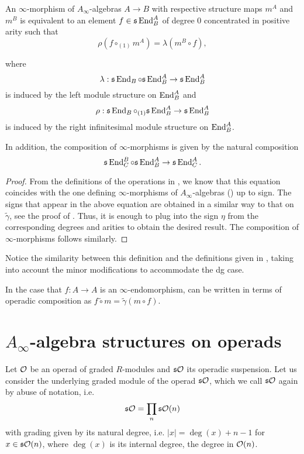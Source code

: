 \documentclass[Thesis.tex]{subfiles}
\begin{document}
\begin{lem}\label{infinitymorphisms}
An $\infty$-morphism of $A_\infty$-algebras $A\to B$ with respective structure maps $m^A$ and $m^B$ is equivalent to an element $f\in\mathfrak{s}\operatorname{End}^A_B$ of degree 0 concentrated in positive arity such that
\begin{equation}\label{operadicmorphism}
\rho(f\circ_{(1)}m^A)=\lambda(m^B\circ f),
\end{equation} 

where \[\lambda:\mathfrak{s}\operatorname{End}_B\circ \mathfrak{s}\operatorname{End}^A_B\to \mathfrak{s}\operatorname{End}^A_B\] is induced by the left module structure on $\operatorname{End}^A_B$ and \[\rho:\mathfrak{s}\operatorname{End}_B\circ_{(1)}\mathfrak{s}\operatorname{End}^A_B\to \mathfrak{s}\operatorname{End}^A_B\] is induced by the right infinitesimal module structure on $\operatorname{End}^A_B$. 

In addition, the composition of $\infty$-morphisms is given by the natural composition \[\mathfrak{s}\operatorname{End}^B_C\circ \mathfrak{s}\operatorname{End}^A_B\to \mathfrak{s}\operatorname{End}^A_C.\]
\end{lem}
\begin{proof}
From the definitions of the operations in , we know that this equation coincides with the one defining $\infty$-morphisms of $A_\infty$-algebras () up to sign. The signs that appear in the above equation are obtained in a similar way to that on $\tilde{\gamma}$, see the proof of . Thus, it is enough to plug into the sign $\eta$ from  the corresponding degrees and arities to obtain the desired result. The composition of $\infty$-morphisms follows similarly.
\end{proof}
Notice the similarity between this definition and the definitions given in \cite[\S 10.2.4]{lodayvallette}, taking into account the minor modifications to accommodate the dg case.

In the case that $f:A\to A$ is an $\infty$-endomorphism,  can be written in terms of operadic composition as $f\tilde{\circ}m=\tilde{\gamma}(m\circ f)$. 


\section{$A_\infty$-algebra structures on operads}\label{sect2}


Let ${\mathcal O}$ be an operad of graded $R$-modules and $\mathfrak{s}{\mathcal O}$ its operadic suspension. Let us consider the underlying graded module of the operad $\mathfrak{s}{\mathcal O}$, which we call $\mathfrak{s}{\mathcal O}$ again by abuse of notation, i.e. \[\mathfrak{s}{\mathcal O}=\prod_n \mathfrak{s}{\mathcal O}(n)\] with grading given by its natural degree, i.e. $|x|=\deg(x)+n-1$ for $x\in \mathfrak{s}{\mathcal O}(n)$, where $\deg(x)$ is its internal degree, the degree in ${\mathcal O}(n)$. 
\end{document}
